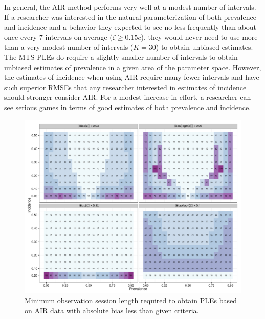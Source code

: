 \documentclass[man, noextraspace, floatsintext]{apa6}\usepackage[]{graphicx}\usepackage[]{color}
\makeatletter
\def\maxwidth{ %
  \ifdim\Gin@nat@width>\linewidth
    \linewidth
  \else
    \Gin@nat@width
  \fi
}
\newenvironment{knitrout}{}{} %
\makeatother
\begin{document}
In general, the AIR method performs very well at a modest number of intervals. If a researcher was interested in the natural parameterization of both prevalence and incidence and a behavior they expected to see no less frequently than about once every 7 intervals on average ($\zeta \geq 0.15c$), they would never need to use more than a very modest number of intervals ($K = 30$) to obtain unbiased estimates. The MTS PLEs do require a slightly smaller number of intervals to obtain unbiased estimates of prevalence in a given area of the parameter space. However, the estimates of incidence when using AIR require many fewer intervals and have such superior RMSEs that any researcher interested in estimates of incidence should stronger consider AIR. For a modest increase in effort, a researcher can see serious games in terms of good estimates of both prevalence and incidence.
\begin{knitrout}
\color{fgcolor}\begin{figure}[tb]


{\centering \includegraphics[width=\maxwidth]{fig/AIR_sample_size} 

}

\caption[Minimum observation session length required to obtain PLEs based on AIR data with absolute bias less than given criteria]{Minimum observation session length required to obtain PLEs based on AIR data with absolute bias less than given criteria.\label{fig:AIR_sample_size}}
\end{figure}


\end{knitrout}
\end{document}
